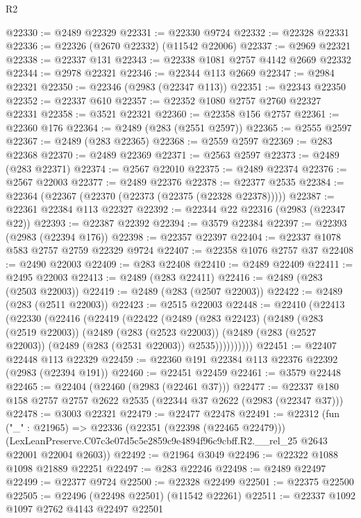 \begin{lexlean}{R2}
\begin{coremodule}
@22330 := @2489 @22329
@22331 := @22330 @9724
@22332 := @22328 @22331
@22336 := @22326 (@2670 @22332) (@11542 @22006)
@22337 := @2969 @22321
@22338 := @22337 @131
@22343 := @22338 @1081 @2757 @4142 @2669 @22332
@22344 := @2978 @22321
@22346 := @22344 @113 @2669
@22347 := @2984 @22321
@22350 := @22346 (@2983 (@22347 @113))
@22351 := @22343 @22350
@22352 := @22337 @610
@22357 := @22352 @1080 @2757 @2760 @22327 @22331
@22358 := @3521 @22321
@22360 := @22358 @156 @2757
@22361 := @22360 @176
@22364 := @2489 (@283 (@2551 @2597))
@22365 := @2555 @2597
@22367 := @2489 (@283 @22365)
@22368 := @2559 @2597
@22369 := @283 @22368
@22370 := @2489 @22369
@22371 := @2563 @2597
@22373 := @2489 (@283 @22371)
@22374 := @2567 @22010
@22375 := @2489 @22374
@22376 := @2567 @22003
@22377 := @2489 @22376
@22378 := @22377 @2535
@22384 := @22364 (@22367 (@22370 (@22373 (@22375 (@22328 @22378)))))
@22387 := @22361 @22384 @113 @22327
@22392 := @22344 @22 @22316 (@2983 (@22347 @22))
@22393 := @22387 @22392
@22394 := @3579 @22384
@22397 := @22393 (@2983 (@22394 @176))
@22398 := @22357 @22397
@22404 := @22337 @1078 @583 @2757 @2759 @22329 @9724
@22407 := @22358 @1076 @2757 @37
@22408 := @2490 @22003
@22409 := @283 @22408
@22410 := @2489 @22409
@22411 := @2495 @22003
@22413 := @2489 (@283 @22411)
@22416 := @2489 (@283 (@2503 @22003))
@22419 := @2489 (@283 (@2507 @22003))
@22422 := @2489 (@283 (@2511 @22003))
@22423 := @2515 @22003
@22448 := @22410
    (@22413
      (@22330
        (@22416
          (@22419
            (@22422
              (@2489
                (@283 @22423)
                (@2489
                  (@283 (@2519 @22003))
                  (@2489
                    (@283 (@2523 @22003))
                    (@2489 (@283 (@2527 @22003)) (@2489 (@283 (@2531 @22003)) @2535))))))))))
@22451 := @22407 @22448 @113 @22329
@22459 := @22360 @191 @22384 @113 @22376 @22392 (@2983 (@22394 @191))
@22460 := @22451 @22459
@22461 := @3579 @22448
@22465 := @22404 (@22460 (@2983 (@22461 @37)))
@22477 := @22337 @180 @158 @2757 @2757 @2622 @2535 (@22344 @37 @2622 (@2983 (@22347 @37)))
@22478 := @3003 @22321
@22479 := @22477 @22478
@22491 := @22312
    (fun ("_" : @21965) =>
    @22336
      (@22351 (@22398 (@22465 @22479)))
      (LexLeanPreserve.C07c3e07d5c5e2859c9e4894f96c9cbff.R2.__rel_25 @2643 @22001 @22004 @2603))
@22492 := @21964 @3049
@22496 := @22322 @1088 @1098 @21889 @22251
@22497 := @283 @22246
@22498 := @2489 @22497
@22499 := @22377 @9724
@22500 := @22328 @22499
@22501 := @22375 @22500
@22505 := @22496 (@22498 @22501) (@11542 @22261)
@22511 := @22337 @1092 @1097 @2762 @4143 @22497 @22501

\end{coremodule}
\end{lexlean}
